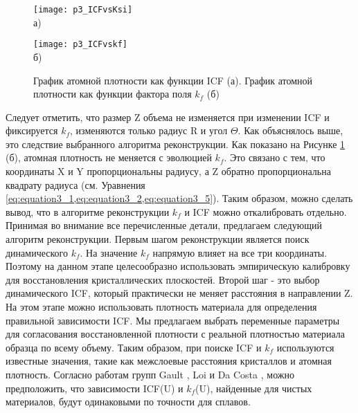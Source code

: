 \begin{figure}[htb]
	\begin{minipage}[b][][b]{0.49\textwidth}\centering
		\texttt{[image: p3\_ICFvsKsi]} \\ а)
	\end{minipage}
	\begin{minipage}[b][][b]{0.49\textwidth}\centering
		\texttt{[image: p3\_ICFvskf]} \\ б)
	\end{minipage}
	\caption{График атомной плотности как функции ICF (а). График атомной плотности как функции фактора поля $k_f$ (б)}
	\label{fig:p3_ICF}
\end{figure}

Следует отметить, что размер Z объема не изменяется при изменении ICF и фиксируется $k_f$, изменяются только радиус R и угол $\Theta$. Как объяснялось выше, это следствие выбранного алгоритма реконструкции. Как показано на Рисунке \cref{fig:p3_ICF} (б), атомная плотность не меняется с эволюцией $k_f$. Это связано с тем, что координаты X и Y пропорциональны радиусу, а Z обратно пропорциональна квадрату радиуса (см. Уравнения \cref{eq:equation3_1,eq:equation3_2,eq:equation3_5}). Таким образом, можно сделать вывод, что в алгоритме реконструкции $k_f$ и ICF можно откалибровать отдельно.
Принимая во внимание все перечисленные детали, предлагаем следующий алгоритм реконструкции. Первым шагом реконструкции является поиск динамического $k_f$. На значение $k_f$ напрямую влияет на все три координаты. Поэтому на данном этапе целесообразно использовать эмпирическую калибровку для восстановления кристаллических плоскостей. Второй шаг - это выбор динамического ICF, который практически не меняет расстояния в направлении Z. На этом этапе можно использовать плотность материала для определения правильной зависимости ICF. Мы предлагаем выбрать переменные параметры для согласования восстановленной плотности с реальной плотностью материала образца по всему объему.
Таким образом, при поиске ICF и $k_f$ используются известные значения, такие как межслоевые расстояния кристаллов и атомная плотность. Согласно работам групп Gault \cite{Gault11_Loi}, Loi \cite{Loi13} и Da Costa \cite{Hatzoglou19}, можно предположить, что зависимости ICF(U) и $k_f$(U), найденные для чистых материалов, будут одинаковыми по точности для сплавов.

